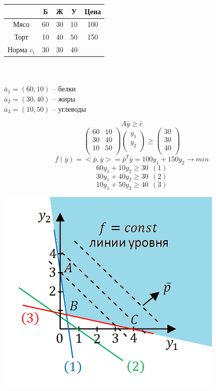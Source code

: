 \begin{center}
    \begin{tabular}{|c|c|c|c|c|}
        \hline
        & Б & Ж & У & Цена \\ \hline
        Мясо & 60 & 30 & 10 & 100\\ \hline
        Торт & 10 & 40 & 50 & 150\\ \hline
        Норма $c_i$ & 30 & 30 & 40 & \\ \hline
    \end{tabular}\\ ~\\
    $\bar a_1=(60, 10)$ -- белки\\
    $\bar a_2=(30, 40)$ -- жиры\\
    $\bar a_3=(10, 50)$ -- углеводы
\end{center}
$$A\bar y \geqslant \bar c$$
\[\begin{pmatrix}
60 & 10\\
30 & 40\\
10 & 50\\
\end{pmatrix}\begin{pmatrix}
y_1\\
y_2\\
\end{pmatrix} \geqslant \begin{pmatrix}
30\\
30\\
40\\
\end{pmatrix}\]
$$f(\bar y)=<\bar p, \bar y>=\bar p^T\bar y=100y_1+150y_2 \to min$$
$$60y_1+10y_2 \geqslant 30~~(1)$$
$$30y_1+40y_2 \geqslant 30~~(2)$$
$$10y_1+50y_2 \geqslant 40~~(3)$$
\begin{center}
    \includegraphics[scale=0.8]{l18_2.png}\\
\end{center}
